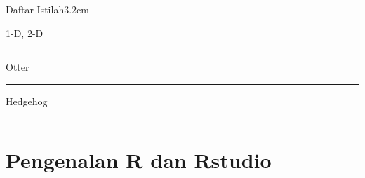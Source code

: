 \documentclass[a4paper, nobind]{templates/ociamthesis}
\begin{document}
\begin{romanpages}
\dominitoc %

\flushbottom

\tableofcontents

\listoffigures
	\mtcaddchapter

\listoftables
  \mtcaddchapter
\begin{mclistof}{Daftar Istilah}{3.2cm}

\item[1-D, 2-D]

\begin{center}\rule{0.5\linewidth}{0.5pt}\end{center}

\item[Otter]

\begin{center}\rule{0.5\linewidth}{0.5pt}\end{center}

\item[Hedgehog]

\begin{center}\rule{0.5\linewidth}{0.5pt}\end{center}

\end{mclistof} 


\end{romanpages}

\flushbottom

\hypertarget{pengenalan-r-dan-rstudio}{%
\chapter{Pengenalan R dan Rstudio}\label{pengenalan-r-dan-rstudio}}
\end{document}
